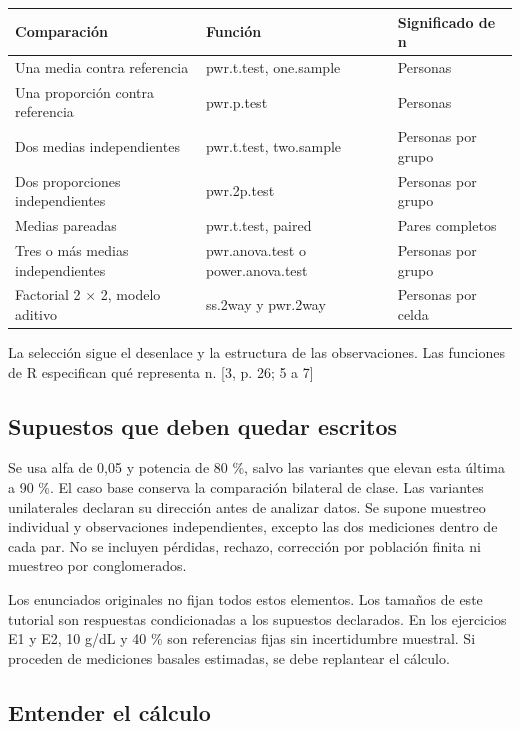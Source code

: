 \documentclass[10pt,a4paper]{article}
\begin{document}
\begingroup\small\begin{longtable}{@{}p{54.0mm}p{54.0mm}p{54.0mm}@{}}\toprule
Comparación & Función & Significado de n\\\midrule
Una media contra referencia & pwr.t.test, one.sample & Personas\\
Una proporción contra referencia & pwr.p.test & Personas\\
Dos medias independientes & pwr.t.test, two.sample & Personas por grupo\\
Dos proporciones independientes & pwr.2p.test & Personas por grupo\\
Medias pareadas & pwr.t.test, paired & Pares completos\\
Tres o más medias independientes & pwr.anova.test o power.anova.test & Personas por grupo\\
Factorial 2 \ensuremath{\times} 2, modelo aditivo & ss.2way y pwr.2way & Personas por celda\\
\bottomrule\end{longtable}\endgroup

La selección sigue el desenlace y la estructura de las observaciones. Las funciones de R especifican qué representa n. [3, p. 26; 5 a 7]

\subsection*{Supuestos que deben quedar escritos}

Se usa alfa de 0,05 y potencia de 80 \%, salvo las variantes que elevan esta última a 90 \%. El caso base conserva la comparación bilateral de clase. Las variantes unilaterales declaran su dirección antes de analizar datos. Se supone muestreo individual y observaciones independientes, excepto las dos mediciones dentro de cada par. No se incluyen pérdidas, rechazo, corrección por población finita ni muestreo por conglomerados.

Los enunciados originales no fijan todos estos elementos. Los tamaños de este tutorial son respuestas condicionadas a los supuestos declarados. En los ejercicios E1 y E2, 10 g/dL y 40 \% son referencias fijas sin incertidumbre muestral. Si proceden de mediciones basales estimadas, se debe replantear el cálculo.

\clearpage
\subsection*{Entender el cálculo}
\end{document}
